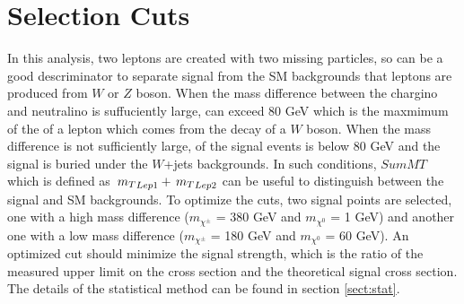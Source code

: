 \section{Selection Cuts}
\label{sect:cuts}
In this analysis, two leptons are created with two missing particles, so \mttwo can be a good descriminator to separate signal 
from the SM backgrounds that leptons are produced from $W$ or $Z$ boson. When the mass difference between the chargino and neutralino 
is suffuciently large, \mttwo can exceed 80 GeV which is the maxmimum of the \mt of a lepton which comes from the decay of a $W$ boson.
When the mass difference is not sufficiently large, \mttwo of the signal events is below 80 GeV and the signal is buried under the $W$+jets
backgrounds. In such conditions, $SumMT$ which is defined as $\,{m_T}_{Lep1} + \,{m_T}_{Lep2}$ can be useful to distinguish between the signal and 
SM backgrounds.
To optimize the cuts, two signal points are selected, one with a high mass difference ($m_{\chi^{\pm}}$ = 380 GeV and $m_{\chi^{0}}$ = 1 GeV) and
another one with a low mass difference ($m_{\chi^{\pm}}$ = 180 GeV and $m_{\chi^{0}}$ = 60 GeV). An optimized cut should minimize the signal strength, 
which is the ratio of the measured upper limit on the cross section and the theoretical signal cross section. The details of the statistical 
method can be found in section \ref{sect:stat}.



